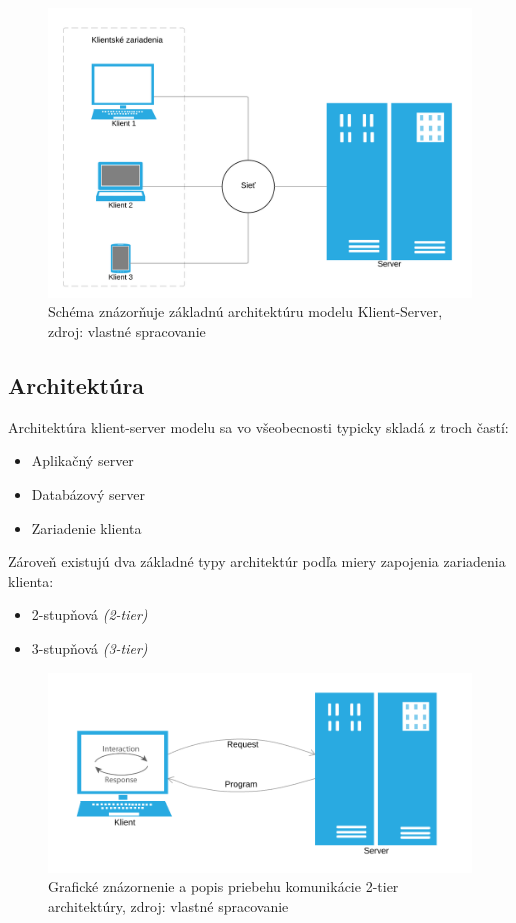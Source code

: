 \documentclass[
  digital, %
  table,   %
  lof,     %
  nolot,   %
  nocover
]{fithesis3}
\begin{document}
\begin{figure}[h]
  \centering
    \includegraphics[width=.94\textwidth]{images/C-S-basic.png}
  \caption{Schéma znázorňuje základnú architektúru modelu Klient-Server, zdroj:
  vlastné spracovanie}
  \label{fig:cs-basic}
\end{figure}

\subsection{Architektúra}
Architektúra klient-server modelu sa vo všeobecnosti typicky skladá z troch 
častí:
\begin{itemize}
	\item Aplikačný server
	\item Databázový server
	\item Zariadenie klienta
\end{itemize}
Zároveň existujú dva základné typy architektúr podľa miery zapojenia zariadenia klienta: 
\begin{itemize}
	\item 2-stupňová \textit{(2-tier)}
	\item 3-stupňová \textit{(3-tier)}
\end{itemize}

\begin{figure}[H]
  \centering
    \includegraphics[width=.82\textwidth]{images/C-S-thick.png}
  \caption{Grafické znázornenie a popis priebehu komunikácie 2-tier architektúry,
  zdroj: vlastné spracovanie}
  \label{fig:cs-thick}
\end{figure}
\end{document}
